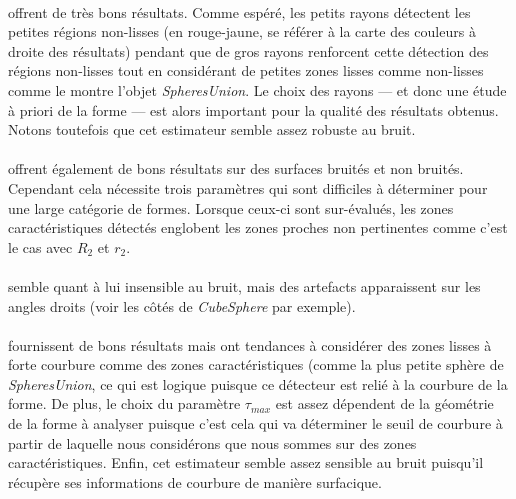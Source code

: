 \paragraph{}
 offrent de très bons résultats. Comme espéré, les petits rayons détectent les petites régions non-lisses (en rouge-jaune, se référer à la carte des couleurs à droite des résultats) pendant que de gros rayons renforcent cette détection des régions non-lisses tout en considérant de petites zones lisses comme non-lisses comme le montre l'objet \emph{SpheresUnion}. Le choix des rayons --- et donc une étude à priori de la forme --- est alors important pour la qualité des résultats obtenus. Notons toutefois que cet estimateur semble assez robuste au bruit.

\paragraph{}
 offrent également de bons résultats sur des surfaces bruités et non bruités. Cependant cela nécessite trois paramètres qui sont difficiles à déterminer pour une large catégorie de formes. Lorsque ceux-ci sont sur-évalués, les zones caractéristiques détectés englobent les zones proches non pertinentes comme c'est le cas avec $R_2$ et $r_2$.

\paragraph{}
 semble quant à lui insensible au bruit, mais des artefacts apparaissent sur les angles droits (voir les côtés de \emph{CubeSphere} par exemple).

\paragraph{}
 fournissent de bons résultats mais ont tendances à considérer des zones lisses à forte courbure comme des zones caractéristiques (comme la plus petite sphère de \emph{SpheresUnion}, ce qui est logique puisque ce détecteur est relié à la courbure de la forme. De plus, le choix du paramètre $\tau_{max}$ est assez dépendent de la géométrie de la forme à analyser puisque c'est cela qui va déterminer le seuil de courbure à partir de laquelle nous considérons que nous sommes sur des zones caractéristiques. Enfin, cet estimateur semble assez sensible au bruit puisqu'il récupère ses informations de courbure de manière surfacique.

